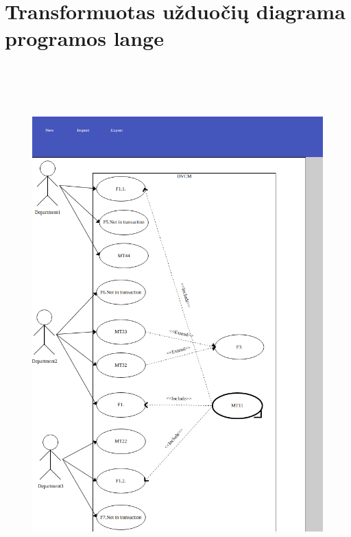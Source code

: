 \documentclass{VUMIFInfBakalaurinis}
\begin{document}
\section{Transformuotas užduočių diagrama programos lange} \label{appendix:use_cases_window}
\begin{figure}[H]
    \centering
    \includegraphics[height=20cm]{img/use_cases_window}
\end{figure}
\end{document}

